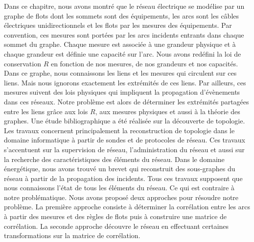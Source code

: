 Dans ce chapitre, nous avons montr\'e que 
le r\'eseau \'electrique se mod\'elise par un graphe de flots dont les sommets sont des \'equipements, les arcs sont les c\^ables \'electriques unidirectionnels et les flots par les mesures des \'equipements. Par convention, ces mesures sont port\'ees par les arcs incidents entrants dans chaque sommet du graphe. 
Chaque mesure est associ\'ee \`a une grandeur physique et \`a chaque grandeur est d\'efinie une capacit\'e sur l'arc. Nous avons red\'efini la loi de conservation $R$ en fonction de nos mesures,  de nos grandeurs et nos capacit\'es.  
\newline
Dans ce graphe, nous connaissons les liens et les mesures qui circulent sur ces liens. 
Mais nous ignorons exactement les extr\'emit\'es de ces liens.
Par ailleurs, ces mesures suivent  des lois physiques qui impliquent la propagation d'\'ev\`enements dans ces r\'eseaux.
Notre probl\`eme est alors de d\'eterminer les extr\'emit\'es partag\'ees entre les liens  gr\^ace aux lois $R$, aux mesures physiques et aussi \`a la th\'eorie des graphes.
\newline
Une \'etude bibliographique a \'et\'e r\'ealis\'ee sur la d\'ecouverte de topologie. Les travaux concernent principalement la reconstruction de topologie dans le domaine informatique \`a partir de sondes et de protocoles de r\'eseau. Ces travaux s'accentuent sur la supervision de r\'eseau, l'administration du r\'eseau et aussi sur la recherche des caract\'eristiques des \'el\'ements du r\'eseau. 
Dans le domaine \'energ\'etique, nous avons trouv\'e un brevet qui reconstruit des sous-graphes du r\'eseau \`a partir de la propagation des incidents.
Tous ces travaux supposent que nous connaissons l'\'etat de tous les \'el\'ements du r\'eseau. Ce qui est contraire \`a notre probl\'ematique.
\newline
 Nous avons propos\'e deux approches pour r\'esoudre notre probl\`eme. La premi\`ere approche consiste \`a d\'eterminer la corr\'elation entre les arcs \`a partir des mesures et des r\`egles de flots puis \`a construire une matrice de corr\'elation. La seconde approche d\'ecouvre le r\'eseau en effectuant certaines transformations sur la matrice de corr\'elation.  
